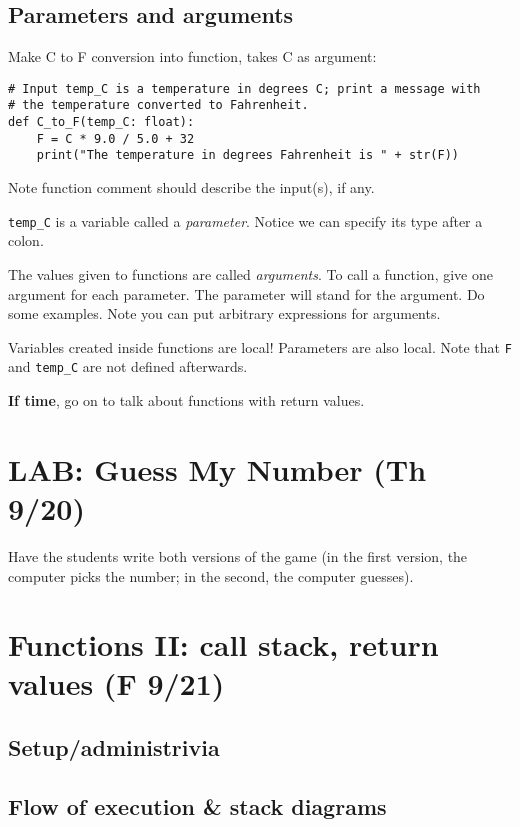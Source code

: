 \documentclass{article}
\begin{document}
\subsection*{Parameters and arguments}

Make C to F conversion into function, takes C as argument:
\begin{verbatim}
# Input temp_C is a temperature in degrees C; print a message with
# the temperature converted to Fahrenheit.
def C_to_F(temp_C: float):
    F = C * 9.0 / 5.0 + 32
    print("The temperature in degrees Fahrenheit is " + str(F))
\end{verbatim}

Note function comment should describe the input(s), if any.

\verb|temp_C| is a variable called a \emph{parameter}.  Notice we can
specify its type after a colon.

The values given to functions are called \emph{arguments}.  To call a
function, give one argument for each parameter.  The parameter will
stand for the argument.  Do some examples.  Note you can put arbitrary
expressions for arguments.

Variables created inside functions are local!  Parameters are also
local. Note that \verb|F| and \verb|temp_C| are not defined afterwards.

\textbf{If time}, go on to talk about functions with return values.

\newpage
\section*{LAB: Guess My Number (Th 9/20)}

Have the students write both versions of the game (in the first
version, the computer picks the number; in the second, the computer
guesses).

\newpage
\section{Functions II: call stack, return values (F 9/21)}

\subsection*{Setup/administrivia}

\subsection*{Flow of execution \& stack diagrams}
\end{document}
